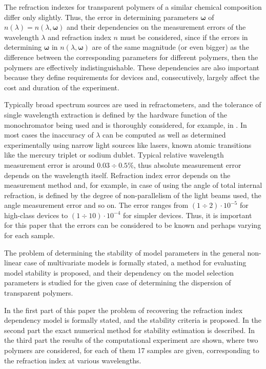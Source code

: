 \documentclass[11pt,a4paper]{article}
\theoremstyle{definition}
\begin{document}
The refraction indexes for transparent polymers of a similar chemical
composition differ only slightly. Thus, the error in determining
parameters $\boldsymbol{\omega}$ of $n(\lambda) = n(\lambda, \boldsymbol{\omega})$
and their dependencies on the measurement errors
of the wavelength $\lambda$ and refraction index $n$ must be considered, since
if the errors in determining $\boldsymbol{\omega}$ in $n(\lambda, \boldsymbol{\omega})$
are of the same magnitude (or even bigger) as the difference between the
corresponding parameters for different polymers, then the polymers are effectively indistinguishable.
These dependencies are also important because they define requirements for 
devices and, consecutively, largely affect the cost and duration of the
experiment.

Typically broad spectrum sources are used in refractometers, and the
tolerance of single wavelength extraction is defined by the hardware function
of the monochromator being used and is thoroughly considered, for example, in
\citep{Malishev79_en,Zaidel72_en}. In most cases the inaccuracy of $\lambda$ can be
computed as well as determined experimentally using narrow light sources like
lasers, known atomic transitions like the mercury triplet or sodium dublet.
Typical relative wavelength measurement error is around $0.03 \div 0.5\%$,
thus absolute measurement error depends on the wavelength itself. Refraction
index error depends on the measurement method and, for example,
in case of using the angle of total internal refraction, is defined by the degree
of non-parallelism of the light beams used, the angle measurement error
and so on. The error ranges from $(1 \div 2) \cdot 10^{-5}$ for high-class
devices to $(1 \div 10) \cdot 10^{-4}$ for simpler devices. Thus, it is important
for this paper that the errors can be considered to be known and perhaps
varying for each sample.

The problem of determining the stability of model parameters
in the general non-linear case of multivariate models is formally stated, a method for evaluating
model stability is proposed, and their dependency on the model selection
parameters is studied for the given case of determining the dispersion
of transparent polymers.

In the first part of this paper the problem of recovering the refraction
index dependency model is formally stated, and the
stability criteria is proposed. In the second part the exact numerical
method for stability estimation is described. In the third part the results
of the computational experiment are shown, where two polymers are considered,
for each of them 17 samples are given, corresponding to the refraction index at
various wavelengths.
\end{document}
